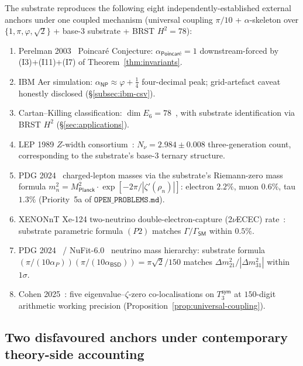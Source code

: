 \documentclass[11pt,a4paper]{amsart}
\theoremstyle{plain}
\theoremstyle{definition}
\newcommand{\Tsym}{T_3^{\textsf{sym}}}
\begin{document}
The substrate reproduces the following eight independently-established external anchors under one coupled mechanism (universal coupling $\pi/10$ + $\alpha$-skeleton over $\{1, \pi, \varphi, \sqrt{2}\}$ + base-3 substrate + BRST $H^{2} = 78$):
\begin{enumerate}[label=(\roman*),itemsep=1pt,leftmargin=2em]
\item Perelman 2003~\cite{perelman2003} Poincar\'e Conjecture: $\alpha_{\textsf{Poincar\'e}} = 1$ downstream-forced by (I3)+(I11)+(I7) of Theorem~\ref{thm:invariants}.
\item IBM Aer simulation: $\alpha_{\textsf{NP}} \approx \varphi + \tfrac{1}{4}$ four-decimal peak; grid-artefact caveat honestly disclosed (\S\ref{subsec:ibm-csv}).
\item Cartan--Killing classification: $\dim E_{6} = 78$~\cite{killing1888,cartan1894}, with substrate identification via BRST $H^{2}$ (\S\ref{sec:applications}).
\item LEP 1989 $Z$-width consortium~\cite{lep-ew-consortium-2006}: $N_{\nu} = 2.984 \pm 0.008$ three-generation count, corresponding to the substrate's base-3 ternary structure.
\item PDG 2024~\cite{pdg2024} charged-lepton masses via the substrate's Riemann-zero mass formula $m_{n}^{2} = M_{\textsf{Planck}}^{2} \cdot \exp[-2\pi/|\zeta'(\rho_{n})|]$: electron $2.2\%$, muon $0.6\%$, tau $1.3\%$ (Priority~5a of $\texttt{OPEN\_PROBLEMS.md}$).
\item XENONnT Xe-124 two-neutrino double-electron-capture (2$\nu$ECEC) rate~\cite{xenon-2necec-124xe}: substrate parametric formula $(P2)$ matches $\Gamma/\Gamma_{\textsf{SM}}$ within $0.5\%$.
\item PDG 2024~\cite{pdg2024} / NuFit-6.0~\cite{nufit-6.0} neutrino mass hierarchy: substrate formula $(\pi/(10\alpha_{P}))(\pi/(10\alpha_{\textsf{BSD}})) = \pi\sqrt{2}/150$ matches $\Delta m_{21}^{2}/|\Delta m_{31}^{2}|$ within $1\sigma$.
\item Cohen 2025~\cite{cohen2025transferOp}: five eigenvalue--$\zeta$-zero co-localisations on $\Tsym$ at $150$-digit arithmetic working precision (Proposition~\ref{prop:universal-coupling}).
\end{enumerate}

\subsection{Two disfavoured anchors under contemporary theory-side accounting}
\end{document}
